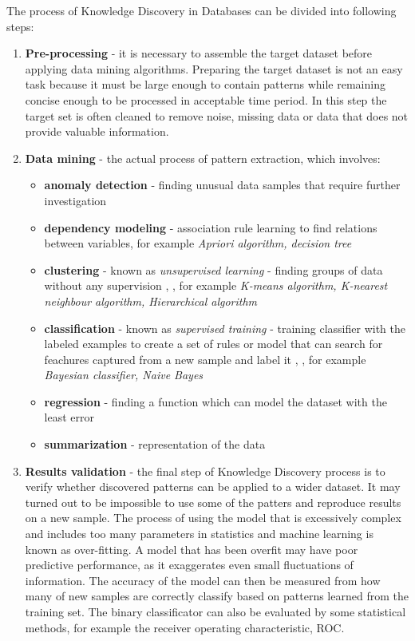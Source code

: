 The process of Knowledge Discovery in Databases can be divided into following steps:

\begin{enumerate}
	\item \textbf{Pre-processing} - it is necessary to assemble the target dataset before applying data mining algorithms. Preparing the target dataset is not an easy task because it must be large enough to contain patterns while remaining concise enough to be processed in acceptable time period. In this step the target set is often cleaned to remove noise, missing data or data that does not provide valuable information.
	\item \textbf{Data mining} - the actual process of pattern extraction, which involves:
		\begin{itemize}
			\item \textbf{anomaly detection} - finding unusual data samples that require further investigation
			\item \textbf{dependency modeling} - association rule learning to find relations between variables, for example \textit{Apriori algorithm, decision tree}
			\item \textbf{clustering} - known as \textit{unsupervised learning} - finding groups of data without any supervision \cite{fe_signal_processing}, , for example \textit{K-means algorithm, K-nearest neighbour algorithm, Hierarchical algorithm}
			\item \textbf{classification} - known as \textit{supervised training} - training classifier with the labeled examples to create a set of rules or model that can search for feachures captured from a new sample and label it \cite{fe_signal_processing}, , for example \textit{Bayesian classifier, Naive Bayes}
			\item \textbf{regression} - finding a function which can model the dataset with the least error
			\item \textbf{summarization} - representation of the data
		\end{itemize}
	\item \textbf{Results validation} - the final step of Knowledge Discovery process is to verify whether discovered patterns can be applied to a wider dataset. It may turned out to be impossible to use some of the patters and reproduce results on a new sample. The process of using the model that is excessively complex and includes too many parameters in statistics and machine learning is known as over-fitting. A model that has been overfit may have poor predictive performance, as it  exaggerates even small fluctuations of information.  The accuracy of the model can then be measured from how many of new samples are correctly classify based on patterns learned from the training set. The binary classificator can also be evaluated by some statistical methods, for example the receiver operating characteristic, ROC.
	
	
	
\end{enumerate} 




